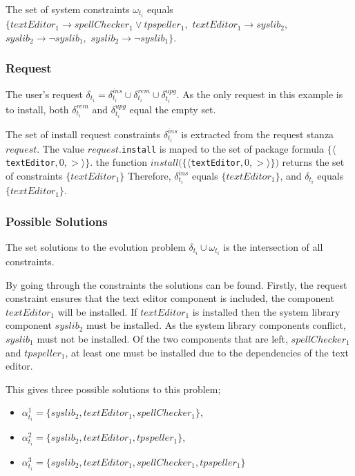 The set of system constraints $\omega_{t_i}$ equals
$\{ textEditor_1 \rightarrow spellChecker_1 \vee tpspeller_1,$ 
$textEditor_1 \rightarrow syslib_2,$ 
$syslib_2 \rightarrow \neg syslib_1,$   
$syslib_2 \rightarrow \neg syslib_1\}$.

\subsubsection{Request}
The user's request $\delta_{t_i} =  \delta_{t_i}^{ins} \cup \delta_{t_i}^{rem} \cup \delta_{t_i}^{upg}$.
As the only request in this example is to install, both $\delta_{t_i}^{rem}$ and $\delta_{t_i}^{upg}$ equal the empty set.

The set of install request constraints $ \delta_{t_i}^{ins}$ is extracted from the request stanza $request$.
The value $request$.\texttt{install} is maped to the set of package formula $\{\langle $\verb+textEditor+$,0,>\rangle\}$.
the function $install(\{\langle $\verb+textEditor+$,0,>\rangle\})$ returns the set of constraints $\{textEditor_1\}$
Therefore, $\delta_{t_i}^{ins}$ equals $\{textEditor_1\}$, and $\delta_{t_i}$ equals $\{textEditor_1\}$.

\subsubsection{Possible Solutions}
The set solutions to the evolution problem $\delta_{t_i} \cup \omega_{t_i}$ is the intersection of all constraints.

By going through the constraints the solutions can be found.
Firstly, the request constraint ensures that the text editor component is included, the component $textEditor_1$ will be installed.
If $textEditor_1$ is installed then the system library component $syslib_2$ must be installed.
As the system library components conflict, $syslib_1$ must not be installed.
Of the two components that are left, $spellChecker_1$ and $tpspeller_1$, at least one must be installed due to the dependencies of the text editor.

This gives three possible solutions to this problem;
\begin{itemize}
  \item $\alpha_{t_i}^1 = \{syslib_2, textEditor_1, spellChecker_1\}$,
  \item $\alpha_{t_i}^2 = \{syslib_2, textEditor_1, tpspeller_1\}$,
  \item $\alpha_{t_i}^3 = \{syslib_2, textEditor_1, spellChecker_1, tpspeller_1\}$
\end{itemize}

